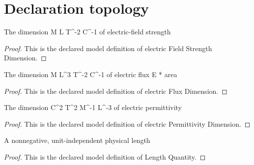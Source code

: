\section{Declaration topology}
\begin{definition}
  \label{def:physics:phyx-mini-0840:phyxminiproblems-problemphyxmini0840-electricfieldstrengthdimension}
  The dimension M L T\textasciicircum{}-2 C\textasciicircum{}-1 of electric-field strength
\end{definition}
\begin{proof}
  This is the declared model definition of electric Field Strength Dimension.
\end{proof}
\begin{definition}
  \label{def:physics:phyx-mini-0840:phyxminiproblems-problemphyxmini0840-electricfluxdimension}
  The dimension M L\textasciicircum{}3 T\textasciicircum{}-2 C\textasciicircum{}-1 of electric flux E * area
\end{definition}
\begin{proof}
  This is the declared model definition of electric Flux Dimension.
\end{proof}
\begin{definition}
  \label{def:physics:phyx-mini-0840:phyxminiproblems-problemphyxmini0840-electricpermittivitydimension}
  The dimension C\textasciicircum{}2 T\textasciicircum{}2 M\textasciicircum{}-1 L\textasciicircum{}-3 of electric permittivity
\end{definition}
\begin{proof}
  This is the declared model definition of electric Permittivity Dimension.
\end{proof}
\begin{definition}
  \label{def:physics:phyx-mini-0840:phyxminiproblems-problemphyxmini0840-lengthquantity}
  A nonnegative, unit-independent physical length
\end{definition}
\begin{proof}
  This is the declared model definition of Length Quantity.
\end{proof}
